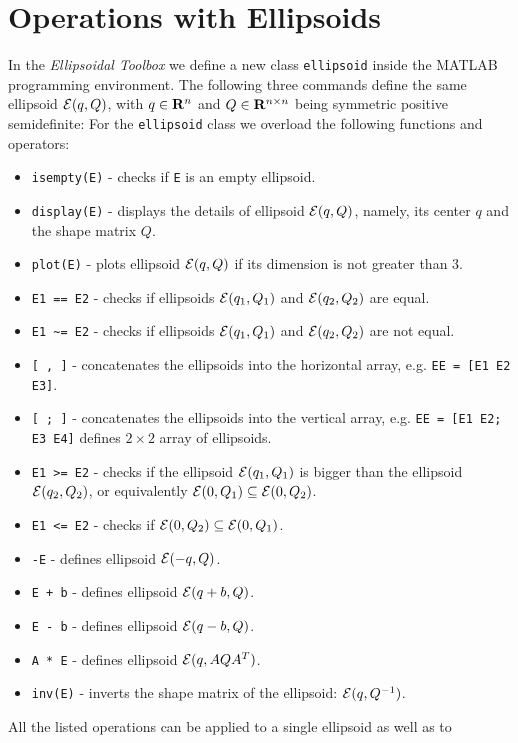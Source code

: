 \documentclass{report}
\newcommand{\EE}{{\cal E}}
\begin{document}
\section{Operations with Ellipsoids}
In the {\it Ellipsoidal Toolbox} we define a new class {\tt ellipsoid} inside
the MATLAB programming environment. The following three commands
define the same ellipsoid $\EE(q,Q)$, with $q\in{\bf R}^n$ and
$Q\in{\bf R}^{n\times n}$ being symmetric positive semidefinite:
For the {\tt ellipsoid} class we overload the following functions and operators:
\begin{itemize}
\item {\tt isempty(E)} - checks if {\tt E} is an empty ellipsoid.
\item {\tt display(E)} - displays the details of ellipsoid $\EE(q,Q)$, namely,
its center $q$ and the shape matrix $Q$.
\item {\tt plot(E)} - plots ellipsoid $\EE(q,Q)$ if its dimension is not greater
than 3.
\item {\tt E1 == E2} - checks if ellipsoids $\EE(q_1,Q_1)$ and
$\EE(q_2,Q_2)$ are equal.
\item {\tt E1 \~{ }= E2} - checks if ellipsoids $\EE(q_1,Q_1)$ and
$\EE(q_2,Q_2)$ are not equal.
\item {\tt [ , ]} - concatenates the ellipsoids into the horizontal array, e.g.
{\tt EE = [E1 E2 E3]}.
\item {\tt [ ; ]} - concatenates the ellipsoids into the vertical array, e.g.
{\tt EE = [E1 E2; E3 E4]} defines $2\times 2$ array of ellipsoids.
\item {\tt E1 >= E2} - checks if the ellipsoid $\EE(q_1,Q_1)$ is bigger than
the ellipsoid $\EE(q_2,Q_2)$, or equivalently $\EE(0,Q_1)\subseteq\EE(0,Q_2)$.
\item {\tt E1 <= E2} - checks if $\EE(0,Q_2)\subseteq\EE(0,Q_1)$.
\item {\tt -E} - defines ellipsoid $\EE(-q,Q)$.
\item {\tt E + b} - defines ellipsoid $\EE(q+b,Q)$.
\item {\tt E - b} - defines ellipsoid $\EE(q-b,Q)$.
\item {\tt A * E} - defines ellipsoid $\EE(q,AQA^T)$.
\item {\tt inv(E)} - inverts the shape matrix of the ellipsoid: $\EE(q,Q^{-1})$.
\end{itemize}
All the listed operations can be applied to a single ellipsoid as well as to
\end{document}
